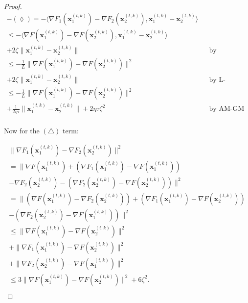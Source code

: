 \begin{proof}
    \begin{align*}
        - (\lozenge) = - \langle \nabla F_1 ( \bm{x}_1^{(t,k)}) -\nabla F_2 ( \bm{x}_2^{(t,k)}),  \bm{x}_1^{(t,k)} - \bm{x}_2^{(t,k)}   \rangle 
        && \text{} \\
        \leq - \langle \nabla F ( \bm{x}_1^{(t,k)}) -\nabla F ( \bm{x}_2^{(t,k)}) ,  \bm{x}_1^{(t,k)} - \bm{x}_2^{(t,k)} \rangle  &&\\
        + 2\zeta  \| \bm{x}_1^{(t,k)} - \bm{x}_2^{(t,k)} \| 
        && \text{by assumption 7} \\
        \leq - \frac{1}{L} \| \nabla F ( \bm{x}_1^{(t,k)}) -\nabla F ( \bm{x}_2^{(t,k)})  \|^2 && \\ 
        + 2\zeta  \| \bm{x}_1^{(t,k)} - \bm{x}_2^{(t,k)} \| 
        && \text{by L-smoothness} \\
        \leq - \frac{1}{L} \| \nabla F ( \bm{x}_1^{(t,k)}) -\nabla F ( \bm{x}_2^{(t,k)})  \|^2 
        &&\\
        + \frac{1}{2 \eta \tau}  \| \bm{x}_1^{(t,k)} - \bm{x}_2^{(t,k)} \|
        + 2 \eta \tau \zeta^2
        && \text{by AM-GM inequality.} \\
    \end{align*}

    Now for the $(\triangle)$ term:

    \begin{align*}
        \|  \nabla F_1 ( \bm{x}_1^{(t,k)}) -\nabla F_2 ( \bm{x}_2^{(t,k)})  \|^2 \\ 
        = \|  \nabla F ( \bm{x}_1^{(t,k)}) + ( \nabla F_1 ( \bm{x}_1^{(t,k)})  - \nabla F ( \bm{x}_1^{(t,k)}) ) \\
        - \nabla F_2 ( \bm{x}_2^{(t,k)}) -  ( \nabla F_2 ( \bm{x}_2^{(t,k)})  - \nabla F ( \bm{x}_2^{(t,k)}) ) \|^2\\
        = \| (\nabla F ( \bm{x}_1^{(t,k)})  - \nabla F_2 ( \bm{x}_2^{(t,k)}) )+ ( \nabla F_1 ( \bm{x}_1^{(t,k)})  - \nabla F ( \bm{x}_2^{(t,k)}) ) \\
        -  ( \nabla F_2 ( \bm{x}_2^{(t,k)})  - \nabla F ( \bm{x}_1^{(t,k)}) ) \|^2 \\
        \leq \| \nabla F ( \bm{x}_1^{(t,k)})  - \nabla F ( \bm{x}_2^{(t,k)}) \|^2 \\
         + \|  \nabla F_1 ( \bm{x}_1^{(t,k)})  - \nabla F ( \bm{x}_2^{(t,k)}) \|^2  \\
        + \| \nabla F_2 ( \bm{x}_2^{(t,k)})  - \nabla F ( \bm{x}_1^{(t,k)})  \|^2 \\
        \leq 3 \| \nabla F ( \bm{x}_1^{(t,k)})  - \nabla F ( \bm{x}_2^{(t,k)}) \|^2 + 6 \zeta^2. \\
    \end{align*}
    

\end{proof}
